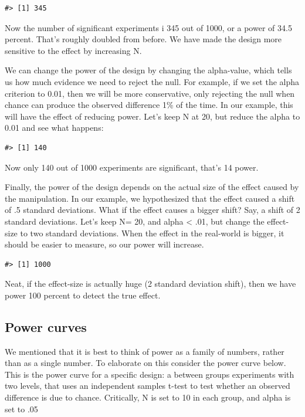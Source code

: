 \documentclass[
  letterpaper,
  DIV=11,
  numbers=noendperiod]{scrreprt}
\begin{document}
\begin{verbatim}
#> [1] 345
\end{verbatim}

Now the number of significant experiments i 345 out of 1000, or a power
of 34.5 percent. That's roughly doubled from before. We have made the
design more sensitive to the effect by increasing N.

We can change the power of the design by changing the alpha-value, which
tells us how much evidence we need to reject the null. For example, if
we set the alpha criterion to 0.01, then we will be more conservative,
only rejecting the null when chance can produce the observed difference
1\% of the time. In our example, this will have the effect of reducing
power. Let's keep N at 20, but reduce the alpha to 0.01 and see what
happens:

\begin{verbatim}
#> [1] 140
\end{verbatim}

Now only 140 out of 1000 experiments are significant, that's 14 power.

Finally, the power of the design depends on the actual size of the
effect caused by the manipulation. In our example, we hypothesized that
the effect caused a shift of .5 standard deviations. What if the effect
causes a bigger shift? Say, a shift of 2 standard deviations. Let's keep
N= 20, and alpha \textless{} .01, but change the effect-size to two
standard deviations. When the effect in the real-world is bigger, it
should be easier to measure, so our power will increase.

\begin{verbatim}
#> [1] 1000
\end{verbatim}

Neat, if the effect-size is actually huge (2 standard deviation shift),
then we have power 100 percent to detect the true effect.

\subsection{Power curves}\label{power-curves}

We mentioned that it is best to think of power as a family of numbers,
rather than as a single number. To elaborate on this consider the power
curve below. This is the power curve for a specific design: a between
groups experiments with two levels, that uses an independent samples
t-test to test whether an observed difference is due to chance.
Critically, N is set to 10 in each group, and alpha is set to .05
\end{document}
